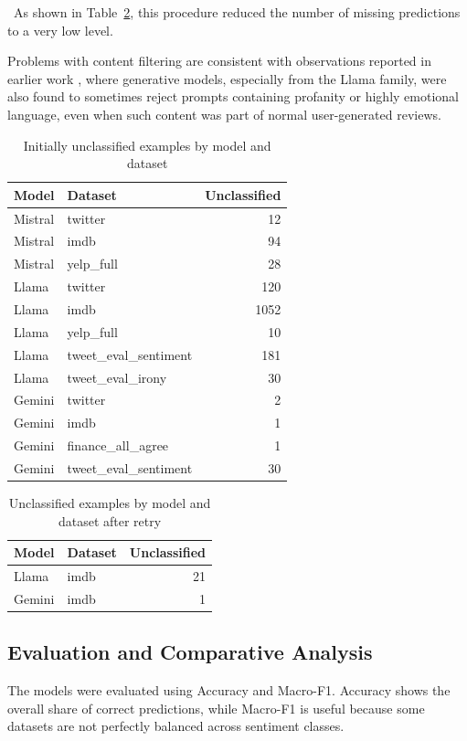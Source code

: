 \documentclass[conference]{IEEEtran}
\begin{document}
~As shown in Table~\ref{tab:unclassified_by_model_after_retry}, this procedure reduced the number of missing predictions to a very low level.

Problems with content filtering are consistent with observations reported in earlier work \cite{sa-in-age-of-genai}, where generative models, especially from the Llama family, were also found to sometimes reject prompts containing profanity or highly emotional language, even when such content was part of normal user-generated reviews.

\begin{table}[H]
\centering
\caption{Initially unclassified examples by model and dataset}
\label{tab:unclassified_by_model}
\begin{tabular}{|l|l|r|}
\hline
\textbf{Model} & \textbf{Dataset} & \textbf{Unclassified} \\
\hline
Mistral & twitter & 12 \\
Mistral & imdb & 94 \\
Mistral & yelp\_full & 28 \\
\hline
Llama & twitter & 120 \\
Llama & imdb & 1052 \\
Llama & yelp\_full & 10 \\
Llama & tweet\_eval\_sentiment & 181 \\
Llama & tweet\_eval\_irony & 30 \\
\hline
Gemini & twitter & 2 \\
Gemini & imdb & 1 \\
Gemini & finance\_all\_agree & 1 \\
Gemini & tweet\_eval\_sentiment & 30 \\
\hline
\end{tabular}
\end{table}
\begin{table}[H]
\centering
\caption{Unclassified examples by model and dataset after retry}
\label{tab:unclassified_by_model_after_retry}
\begin{tabular}{|l|l|r|}
\hline
\textbf{Model} & \textbf{Dataset} & \textbf{Unclassified} \\
\hline
Llama & imdb & 21 \\
\hline
Gemini & imdb & 1 \\
\hline
\end{tabular}
\end{table}

\subsection{Evaluation and Comparative Analysis}
The models were evaluated using Accuracy and Macro-F1. Accuracy shows the overall share of correct predictions, while Macro-F1 is useful because some datasets are not perfectly balanced across sentiment classes.
\end{document}

